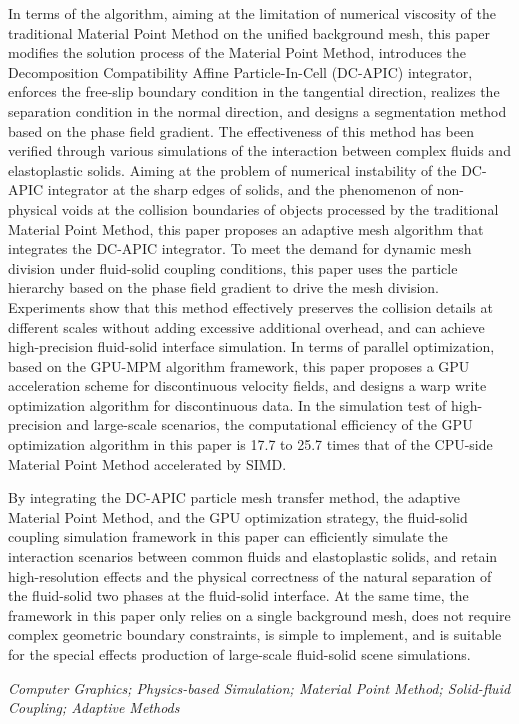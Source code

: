 In terms of the algorithm, aiming at the limitation of numerical viscosity of the traditional Material Point Method on the unified background mesh, this paper modifies the solution process of the Material Point Method, introduces the Decomposition Compatibility Affine Particle-In-Cell (DC-APIC) integrator, enforces the free-slip boundary condition in the tangential direction, realizes the separation condition in the normal direction, and designs a segmentation method based on the phase field gradient. The effectiveness of this method has been verified through various simulations of the interaction between complex fluids and elastoplastic solids. Aiming at the problem of numerical instability of the DC-APIC integrator at the sharp edges of solids, and the phenomenon of non-physical voids at the collision boundaries of objects processed by the traditional Material Point Method, this paper proposes an adaptive mesh algorithm that integrates the DC-APIC integrator. To meet the demand for dynamic mesh division under fluid-solid coupling conditions, this paper uses the particle hierarchy based on the phase field gradient to drive the mesh division. Experiments show that this method effectively preserves the collision details at different scales without adding excessive additional overhead, and can achieve high-precision fluid-solid interface simulation. In terms of parallel optimization, based on the GPU-MPM algorithm framework, this paper proposes a GPU acceleration scheme for discontinuous velocity fields, and designs a warp write optimization algorithm for discontinuous data. In the simulation test of high-precision and large-scale scenarios, the computational efficiency of the GPU optimization algorithm in this paper is 17.7 to 25.7 times that of the CPU-side Material Point Method accelerated by SIMD.

By integrating the DC-APIC particle mesh transfer method, the adaptive Material Point Method, and the GPU optimization strategy, the fluid-solid coupling simulation framework in this paper can efficiently simulate the interaction scenarios between common fluids and elastoplastic solids, and retain high-resolution effects and the physical correctness of the natural separation of the fluid-solid two phases at the fluid-solid interface. At the same time, the framework in this paper only relies on a single background mesh, does not require complex geometric boundary constraints, is simple to implement, and is suitable for the special effects production of large-scale fluid-solid scene simulations. 



{} \textit{Computer Graphics; Physics-based Simulation; Material Point Method; Solid-fluid Coupling; Adaptive Methods}


{}